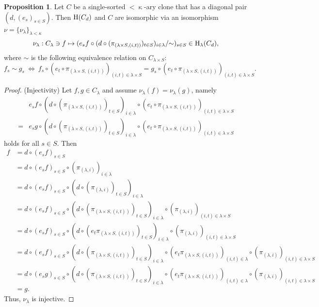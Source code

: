 \documentclass[a4paper,10pt]{article}
\theoremstyle{definition}
\newtheorem{prop}[df]{Proposition}
\newcommand\mc{\mathclose}
\begin{document}
\begin{prop}\label{clone-single}
Let $C$ be a single-sorted $<\mc\kappa$-ary clone that has a diagonal pair $(d,(e_s)_{s\in S})$.
Then ${\rm H}(C_d)$ and $C$ are isomorphic via an isomorphism $\nu=\{\nu_\lambda\}_{\lambda<\kappa}$
\[
\nu_{\lambda}:C_\lambda\ni f\mapsto
(e_sf\circ (d\circ (\pi_{(\lambda\times S,(i,t))})_{t\in S})_{i\in \lambda}/\mc\sim)_{s\in S}
 \in {\rm H}_\lambda(C_d),
\]
where $\sim$ is the following equivalence relation on $C_{\lambda\times S}$:
\[
f_s\sim g_s\ \Longleftrightarrow \
  f_s\circ (e_t\circ \pi_{(\lambda\times S,(i,t))})_{(i,t)\in\lambda\times S}
 =g_s\circ (e_t\circ \pi_{(\lambda\times S,(i,t))})_{(i,t)\in\lambda\times S}.
\]
\end{prop}
\begin{proof}
(Injectivity) Let $f,g\in C_\lambda$ and assume $\nu_\lambda(f)=\nu_\lambda(g)$,
namely
\begin{align*}
&e_sf\circ (d\circ (\pi_{(\lambda\times S,(i,t))})_{t\in S})_{i\in\lambda}
  \circ (e_t\circ \pi_{(\lambda\times S,(i,t))})_{(i,t)\in\lambda\times S}\\
=&e_sg\circ (d\circ (\pi_{(\lambda\times S,(i,t))})_{t\in S})_{i\in\lambda}
  \circ (e_t\circ \pi_{(\lambda\times S,(i,t))})_{(i,t)\in\lambda\times S}
\end{align*}
holds for all $s\in S$. Then
\begin{align*}
f
&=d\circ (e_sf)_{s\in S}\\
&=d\circ (e_sf)_{s\in S}\circ (\pi_{(\lambda,i)})_{i\in\lambda}\\
&=d\circ (e_sf)_{s\in S}\circ (d\circ (\pi_{(\lambda,i)})_{t\in S})_{i\in\lambda}\\
&=d\circ (e_sf)_{s\in S}\circ 
  (d\circ (\pi_{(\lambda\times S,(i,t))})_{t\in S})_{i\in\lambda}
  \circ (\pi_{(\lambda,i)})_{(i,t)\in\lambda\times S}\\
&=d\circ (e_sf)_{s\in S}\circ 
  (d\circ (e_t\pi_{(\lambda\times S,(i,t))})_{t\in S})_{i\in\lambda}
  \circ (\pi_{(\lambda,i)})_{(i,t)\in\lambda\times S}\\
&=d\circ (e_sf)_{s\in S}\circ 
  (d\circ (\pi_{(\lambda\times S,(i,t))})_{t\in S})_{i\in\lambda}
  \circ (e_t\pi_{(\lambda\times S,(i,t))})_{(i,t)\in\lambda}\circ (\pi_{(\lambda,i)})_{(i,t)\in\lambda\times S}\\
&=d\circ (e_sg)_{s\in S}\circ 
  (d\circ (\pi_{(\lambda\times S,(i,t))})_{t\in S})_{i\in\lambda}
  \circ (e_t\pi_{(\lambda\times S,(i,t))})_{(i,t)\in\lambda}\circ (\pi_{(\lambda,i)})_{(i,t)\in\lambda\times S}\\
&=g.
\end{align*}
Thus, $\nu_\lambda$ is injective.


\end{proof}
\end{document}
